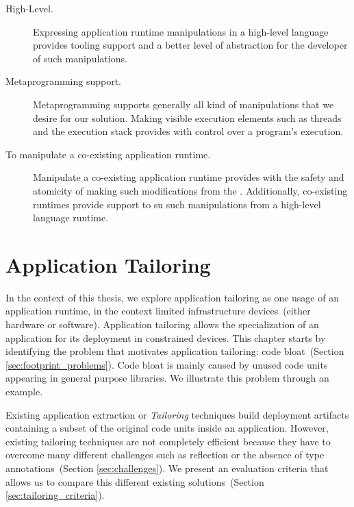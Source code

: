 \begin{description}

\item[High-Level.] Expressing application runtime manipulations in a high-level language provides tooling support and a better level of abstraction for the developer of such manipulations. 

\item[Metaprogramming support.] Metaprogramming supports generally all kind of manipulations that we desire for our solution. Making visible execution elements such as threads and the execution stack provides with control over a program's execution.

\item[To manipulate a co-existing application runtime.] Manipulate a co-existing application runtime provides with the safety and atomicity of making such modifications from the \VM. Additionally, co-existing runtimes provide support to su such manipulations from a high-level language runtime.

\end{description}


\chapter{Application Tailoring}
\minitoc

In the context of this thesis, we explore application tailoring as one usage of an application runtime, in the context limited infrastructure devices~(either hardware or software).
Application tailoring allows the specialization of an application for its deployment in constrained devices.
This chapter starts by identifying the problem that motivates application tailoring: code bloat~(Section \ref{sec:footprint_problems}). Code bloat is mainly caused by unused code units appearing in general purpose libraries.
We illustrate this problem through an example.

Existing application extraction or \emph{Tailoring} techniques build deployment artifacts containing a subset of the original code units inside an application. However, existing tailoring techniques are not completely efficient because they have to overcome many different challenges such as reflection or the absence of type annotations~(Section \ref{sec:challenges}). We present an evaluation criteria that allows us to compare this different existing solutions~(Section \ref{sec:tailoring_criteria}).

